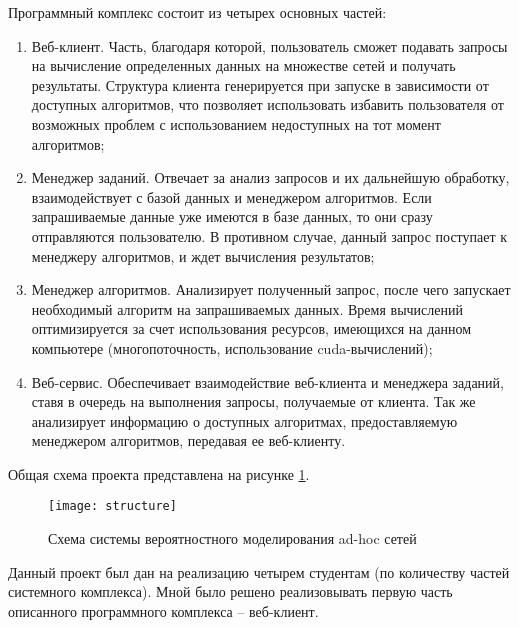 Программный комплекс состоит из четырех основных частей:
\begin{enumerate}
\item Веб-клиент. Часть, благодаря которой, пользователь сможет подавать запросы на вычисление определенных данных на множестве сетей и получать результаты. Структура клиента генерируется при запуске в зависимости от доступных алгоритмов, что позволяет использовать избавить пользователя от возможных проблем с использованием недоступных на тот момент алгоритмов; 
\item Менеджер заданий. Отвечает за анализ запросов и их дальнейшую обработку, взаимодействует с базой данных и менеджером алгоритмов. Если запрашиваемые данные уже имеются в базе данных, то они сразу отправляются пользователю. В противном случае, данный запрос поступает к менеджеру алгоритмов, и ждет вычисления результатов;
\item Менеджер алгоритмов. Анализирует полученный запрос, после чего запускает необходимый алгоритм на запрашиваемых данных. Время вычислений оптимизируется за счет использования ресурсов, имеющихся на данном компьютере (многопоточность, использование cuda-вычислений);
\item Веб-сервис. Обеспечивает взаимодействие веб-клиента и менеджера заданий, ставя в очередь на выполнения запросы, получаемые от клиента. Так же анализирует информацию о доступных алгоритмах, предоставляемую менеджером алгоритмов, передавая ее веб-клиенту.  
\end{enumerate}
Общая схема проекта представлена на рисунке \ref{structure}.

\begin{figure}[ht]
\center\texttt{[image: structure]}
\caption{Схема системы вероятностного моделирования ad-hoc сетей}\label{structure}
\end{figure}

Данный проект был дан на реализацию четырем студентам (по количеству частей системного комплекса). Мной было решено реализовывать первую часть описанного программного комплекса – веб-клиент. 